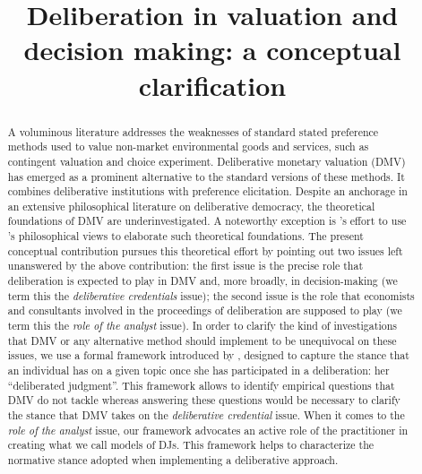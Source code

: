 \documentclass[a4paper, 11pt]{article}
\begin{document}
\title{Deliberation in valuation and decision making: a conceptual clarification}
\author{}

\maketitle


\begin{abstract}
A voluminous literature addresses the weaknesses of standard stated preference methods used to value non-market environmental goods and services, such as contingent valuation and choice experiment. 
Deliberative monetary valuation (DMV) has emerged as a prominent alternative to the standard versions of these methods. It combines deliberative institutions with preference elicitation. 
Despite an anchorage in an extensive philosophical literature on deliberative democracy, the theoretical foundations of DMV are underinvestigated.  
A noteworthy exception is \citet{bartkowski_beyond_2018}’s effort to use \citeauthor{sen_idea_2009}’s philosophical views to elaborate such theoretical foundations. 
The present conceptual contribution pursues this theoretical effort by pointing out two issues left unanswered by the above contribution: 
the first issue is the precise role that deliberation is expected to play in DMV and, more broadly, in decision-making (we term this the \emph{deliberative credentials} issue); 
the second issue is the role that economists and consultants involved in the proceedings of deliberation are supposed to play (we term this the \emph{role of the analyst} issue). 
In order to clarify the kind of investigations that DMV or any alternative method should implement to be unequivocal on these issues, we use a formal framework introduced by \citet{cailloux_formal_2019}, designed to capture the stance that an individual has on a given topic once she has participated in a deliberation: her “deliberated judgment”. 
This framework allows to identify empirical questions that DMV do not tackle whereas answering these questions would be necessary to clarify the stance that DMV takes on the \emph{deliberative credential} issue. 
When it comes to the \emph{role of the analyst} issue, our framework advocates an active role of the practitioner in creating what we call models of \aclp{DJ}. 
This framework helps to characterize the normative stance adopted when implementing a deliberative approach.
\end{abstract}
\acresetall
\end{document}
